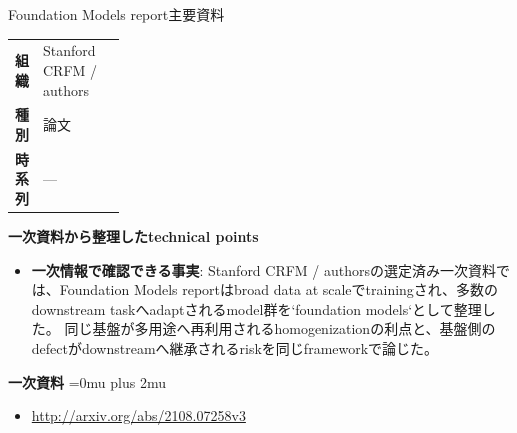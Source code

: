 \begin{technicalnote}{Foundation Models report}{主要資料}
\begingroup
\begin{tabularx}{\linewidth}{@{}>{\bfseries}p{0.22\linewidth}X@{}}
組織 & Stanford CRFM / authors \\
種別 & 論文 \\
時系列 & — \\
\end{tabularx}
\smallskip
{\bfseries 一次資料から整理したtechnical points}
\begin{itemize}[leftmargin=1.5em,itemsep=0.35em]
\item \textbf{一次情報で確認できる事実}: Stanford CRFM / authorsの選定済み一次資料では、Foundation Models reportはbroad data at scaleでtrainingされ、多数のdownstream taskへadaptされるmodel群を`foundation models`として整理した。 同じ基盤が多用途へ再利用されるhomogenizationの利点と、基盤側のdefectがdownstreamへ継承されるriskを同じframeworkで論じた。
\end{itemize}
\begin{minipage}{\linewidth}
\begin{samepage}
{\bfseries 一次資料}
\begingroup\sloppy
\Urlmuskip=0mu plus 2mu\relax
\begin{itemize}[leftmargin=1.5em,itemsep=0.25em]
\item {\scriptsize\url{http://arxiv.org/abs/2108.07258v3}}
\end{itemize}
\endgroup
\end{samepage}
\end{minipage}
\endgroup
\end{technicalnote}
\medskip

